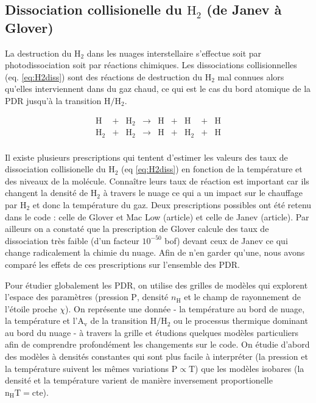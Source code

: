 \subsection{Dissociation collisionelle du $\mathrm{H}_2$ (de Janev à Glover)}

La destruction du $\mathrm{H}_2$ dans les nuages interstellaire s'effectue soit par photodissociation soit par réactions chimiques. Les dissociations collisionnelles (eq. \ref{eq:H2diss}) sont des réactions de destruction du $\mathrm{H}_2$ mal connues alors qu'elles interviennent dans du gaz chaud, ce qui est le cas du bord atomique de la PDR jusqu'à la transition $\mathrm{H}/\mathrm{H}_2$. 

\begin{equation}\label{eq:H2diss}
    \begin{array}{lcccccccl}
        \mathrm{H} & + & \mathrm{H}_2   & \rightarrow &\mathrm{H}  & + & \mathrm{H} & + & \mathrm{H} \\
        \mathrm{H}_2  & + & \mathrm{H}_2  & \rightarrow & \mathrm{H} & + &\mathrm{H}_2  & + & \mathrm{H} \\
    \end{array}
\end{equation}

Il existe plusieurs prescriptions qui tentent d'estimer les valeurs des taux de dissociation collisionelle du $\mathrm{H}_2$ (eq \ref{eq:H2diss}) en fonction de la température et des niveaux de la molécule. Connaître leurs taux de réaction est important car ils changent la densité de $\mathrm{H}_2$ à travers le nuage ce qui a un impact sur le chauffage par $\mathrm{H}_2$ et donc la température du gaz. Deux prescriptions possibles ont été retenu dans le code : celle de Glover et Mac Low (article) et celle de Janev (article). Par ailleurs on a constaté que la prescription de Glover calcule des taux de dissociation très faible (d'un facteur $10^{-50}$ bof) devant ceux de Janev ce qui change radicalement la chimie du nuage. Afin de n'en garder qu'une, nous avons comparé les effets de ces prescriptions sur l'ensemble des PDR. \newline 

Pour étudier globalement les PDR, on utilise des grilles de modèles qui explorent l'espace des paramètres (pression $\mathrm{P}$, densité $n_\mathrm{H}$ et le champ de rayonnement de l'étoile proche $\chi$). On représente une donnée - la température au bord de nuage, la température et l'$\mathrm{A}_\mathrm{v}$ de la transition $\mathrm{H}/\mathrm{H}_2$ ou le processus thermique dominant au bord du nuage - à travers la grille et étudions quelques modèles particuliers afin de comprendre profondément les changements sur le code. On étudie d'abord des modèles à densités constantes qui sont plus facile à interpréter (la pression et la température suivent les mêmes variations $\mathrm{P}\propto \mathrm{T}$) que les modèles isobares (la densité et la température varient de manière inversement proportionelle $\mathrm{n}_\mathrm{H}\mathrm{T}=\mathrm{cte}$).    

